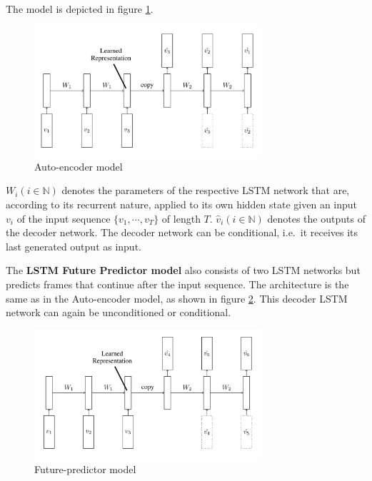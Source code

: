 The model is depicted in figure \ref{fig:unsupervisedlstms_autoencoder}.

\begin{figure}[H]
    \centering
    \includegraphics[width=0.75\textwidth]{img_deep/unsupervisedlstms_autoencoder}
    \caption{Auto-encoder model \cite{srivastava_unsupervised_2015}}
    \label{fig:unsupervisedlstms_autoencoder}
\end{figure}

$W_i (i \in \mathbb{N})$ denotes the parameters of the respective LSTM network that are, according to its recurrent nature, applied to its own hidden state given an input $v_i$ of the input sequence $\{v_1, \cdots, v_T\}$ of length $T$.
$\hat{v}_i (i \in \mathbb{N})$ denotes the outputs of the decoder network.
The decoder network can be conditional, i.e.\ it receives its last generated output as input.

The \textbf{LSTM Future Predictor model} also consists of two LSTM networks but predicts frames that continue after the input sequence.
The architecture is the same as in the Auto-encoder model, as shown in figure \ref{fig:unsupervisedlstms_futurepredictor}.
This decoder LSTM network can again be unconditioned or conditional.

\begin{figure}[H]
    \centering
    \includegraphics[width=0.75\textwidth]{img_deep/unsupervisedlstms_futurepredictor}
    \caption{Future-predictor model \cite{srivastava_unsupervised_2015}}
    \label{fig:unsupervisedlstms_futurepredictor}
\end{figure}

